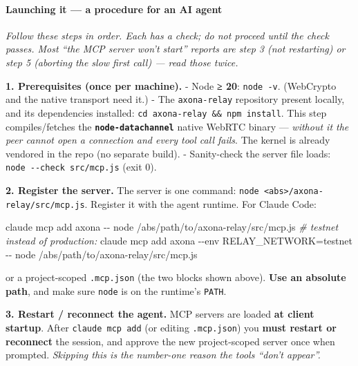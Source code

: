 \documentclass[
  nobib]{tufte-handout}
\newenvironment{Shaded}{}{}
\newcommand{\AttributeTok}[1]{\textcolor[rgb]{0.49,0.56,0.16}{#1}}
\newcommand{\CommentTok}[1]{\textcolor[rgb]{0.38,0.63,0.69}{\textit{#1}}}
\newcommand{\ExtensionTok}[1]{#1}
\newcommand{\NormalTok}[1]{#1}
\begin{document}
\paragraph{Launching it --- a procedure for an AI
agent}\label{launching-it-a-procedure-for-an-ai-agent}

\emph{Follow these steps in order. Each has a check; do not proceed
until the check passes. Most ``the MCP server won't start'' reports are
step 3 (not restarting) or step 5 (aborting the slow first call) ---
read those twice.}

\textbf{1. Prerequisites (once per machine).} - Node \textbf{≥ 20}:
\texttt{node\ -v}. (WebCrypto and the native transport need it.) - The
\texttt{axona-relay} repository present locally, and its dependencies
installed: \texttt{cd\ axona-relay\ \&\&\ npm\ install}. This step
compiles/fetches the \textbf{\texttt{node-datachannel}} native WebRTC
binary --- \emph{without it the peer cannot open a connection and every
tool call fails}. The kernel is already vendored in the repo (no
separate build). - Sanity-check the server file loads:
\texttt{node\ -\/-check\ src/mcp.js} (exit 0).

\textbf{2. Register the server.} The server is one command:
\texttt{node\ \textless{}abs\textgreater{}/axona-relay/src/mcp.js}.
Register it with the agent runtime. For Claude Code:

\begin{Shaded}
\begin{Highlighting}[]
\ExtensionTok{claude}\NormalTok{ mcp add axona }\AttributeTok{{-}{-}}\NormalTok{ node /abs/path/to/axona{-}relay/src/mcp.js}
\CommentTok{\# testnet instead of production:}
\ExtensionTok{claude}\NormalTok{ mcp add axona }\AttributeTok{{-}{-}env}\NormalTok{ RELAY\_NETWORK=testnet }\AttributeTok{{-}{-}}\NormalTok{ node /abs/path/to/axona{-}relay/src/mcp.js}
\end{Highlighting}
\end{Shaded}

or a project-scoped \texttt{.mcp.json} (the two blocks shown above).
\textbf{Use an absolute path}, and make sure \texttt{node} is on the
runtime's \texttt{PATH}.

\textbf{3. Restart / reconnect the agent.} MCP servers are loaded
\textbf{at client startup}. After \texttt{claude\ mcp\ add} (or editing
\texttt{.mcp.json}) you \textbf{must restart or reconnect} the session,
and approve the new project-scoped server once when prompted.
\emph{Skipping this is the number-one reason the tools ``don't
appear''.}
\end{document}
